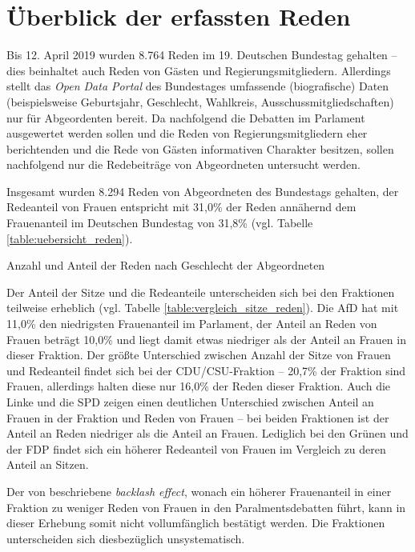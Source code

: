 \documentclass[12pt, 
    twoside=false, 
    bibliography=totoc, 
    numbers=endperiod, 
    headings=normal, 
    toc=chapterentrydotfill
    ]{scrbook}
\begin{document}
\section{Überblick der erfassten Reden}\label{kapitel:ueberblick_reden}

Bis 12. April 2019 wurden 8.764 Reden im 19. Deutschen Bundestag gehalten -- dies beinhaltet auch Reden von Gästen und Regierungsmitgliedern. Allerdings stellt das \emph{Open Data Portal} des Bundestages umfassende (biografische) Daten (beispielsweise Geburtsjahr, Geschlecht, Wahlkreis, Ausschussmitgliedschaften) nur für Abgeordenten bereit. Da nachfolgend die Debatten im Parlament ausgewertet werden sollen und die Reden von Regierungsmitgliedern eher berichtenden und die Rede von Gästen informativen Charakter besitzen, sollen nachfolgend nur die Redebeiträge von Abgeordneten untersucht werden.

Insgesamt wurden 8.294 Reden von Abgeordneten des Bundestags gehalten, der Redeanteil von Frauen entspricht mit 31,0\% der Reden annähernd dem Frauenanteil im Deutschen Bundestag von 31,8\% (vgl. Tabelle \ref{table:uebersicht_reden}).

\begin{table}[htb]
    \centering
    \caption{Anzahl und Anteil der Reden nach Geschlecht der Abgeordneten}
    
    \label{table:uebersicht_reden}
\end{table}

Der Anteil der Sitze und die Redeanteile unterscheiden sich bei den Fraktionen teilweise erheblich (vgl. Tabelle \ref{table:vergleich_sitze_reden}). Die AfD hat mit 11,0\% den niedrigsten Frauenanteil im Parlament, der Anteil an Reden von Frauen beträgt 10,0\% und liegt damit etwas niedriger als der Anteil an Frauen in dieser Fraktion. 
Der größte Unterschied zwischen Anzahl der Sitze von Frauen und Redeanteil findet sich bei der CDU/CSU-Fraktion -- 20,7\% der Fraktion sind Frauen, allerdings halten diese nur 16,0\% der Reden dieser Fraktion. Auch die Linke und die SPD zeigen  einen deutlichen Unterschied zwischen Anteil an Frauen in der Fraktion und Reden von Frauen -- bei beiden Fraktionen ist der Anteil an Reden niedriger als die Anteil an Frauen. Lediglich bei den Grünen und der FDP findet sich ein höherer Redeanteil von Frauen im Vergleich zu deren Anteil an Sitzen.

Der von \textcite{back_2018} beschriebene \emph{backlash effect}, wonach ein höherer Frauenanteil in einer Fraktion zu weniger Reden von Frauen in den Paralmentsdebatten führt, kann in dieser Erhebung somit nicht vollumfänglich bestätigt werden. Die Fraktionen unterscheiden sich diesbezüglich unsystematisch. 
\end{document}
